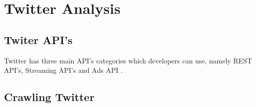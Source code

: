 \chapter{Twitter Analysis}\label{chap:twitter-analysis}

\section{Twiter API's}
Twitter has three main API's categories which developers can use, namely REST
API's, Streaming API's and Ads API \citep{TwitterDevDocs}.\nl


\section{Crawling Twitter}

